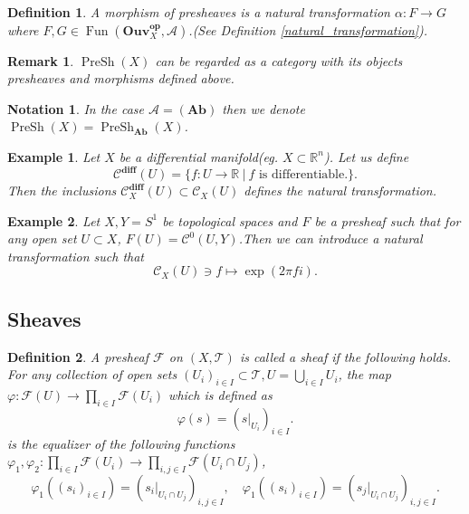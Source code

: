 \documentclass{article}
\newtheorem{definition}{Definition}[section]
\newtheorem{notation}{Notation}[section]
\newtheorem{remark}{Remark}[section]
\newtheorem{example}{Example}[section]
\numberwithin{equation}{section}
\DeclareMathOperator{\PreSh}{PreSh}
\DeclareMathOperator{\Fun}{Fun}
\begin{document}
\begin{definition}
A morphism of presheaves is a natural transformation $\alpha:F\to G$ where $F,G\in\Fun(\mathbf{Ouv}_X^{\mathbf{op}},\mathcal{A})$.(See Definition \ref{natural_transformation}).
\end{definition}

\begin{remark}
$\PreSh(X)$ can be regarded as a category with its objects presheaves and morphisms defined above. 
\end{remark}

\begin{notation}
In the case $\mathcal{A}= (\mathbf{Ab})$ then we denote $\PreSh(X)=\PreSh_{\mathbf{Ab}}(X)$.
\end{notation}

\begin{example}
Let $X$ be a differential manifold(eg. $X\subset\mathbb{R}^n$). Let us define 
\begin{equation*}
\mathcal{C}^{\mathbf{diff}}(U) = \{f:U\to\mathbb{R}\:|\:f\text{ is differentiable.}\}. 
\end{equation*}
Then the inclusions $\mathcal{C}_X^{\mathbf{diff}}(U)\subset\mathcal{C}_X(U)$ defines the natural transformation.
\end{example}

\begin{example}
Let $X,Y=S^1$ be topological spaces and $F$ be a presheaf such that for any open set $U\subset X$, $F(U)=\mathcal{C}^0(U,Y)$.Then we can introduce a natural transformation such that 
\begin{equation*}
\mathcal{C}_X(U)\ni f\mapsto \exp(2\pi fi).
\end{equation*}
\end{example}

\subsection{Sheaves}

\begin{definition}
A presheaf $\mathcal{F}$ on $(X,\mathcal{T})$ is called a sheaf if the following holds.
For any collection of open sets $(U_i)_{i\in I}\subset \mathcal{T},U=\bigcup_{i\in I}U_i$, the map $\varphi:\mathcal{F}(U)\to\prod_{i\in I}\mathcal{F}(U_i)$ which is defined as
\begin{equation*}
\varphi(s) = (s|_{U_i})_{i\in I}.
\end{equation*}
is the equalizer of the following functions $\varphi_1,\varphi_2:\prod_{i\in I}\mathcal{F}(U_i)\to\prod_{i,j\in I}\mathcal{F}(U_i\cap U_j)$, 
\begin{equation*}
\varphi_1((s_i)_{i\in I}) = (s_i|_{U_i\cap U_j})_{i,j\in I},\quad\varphi_1((s_i)_{i\in I}) = (s_j|_{U_i\cap U_j})_{i,j\in I}.
\end{equation*}
\end{definition}
\end{document}
